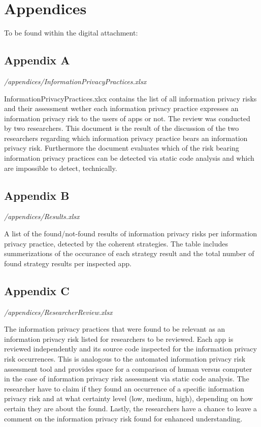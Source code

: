 \section*{Appendices}

To be found within the digital attachment:

\subsection*{Appendix A}

\textit{/appendices/InformationPrivacyPractices.xlsx}

InformationPrivacyPractices.xlsx contains the list of all information privacy risks and their assessment wether each information privacy practice expresses an information privacy risk to the users of \mH apps or not.
The review was conducted by two researchers. 
This document is the result of the discussion of the two researchers regarding which information privacy practice bears an information privacy risk.
Furthermore the document evaluates which of the risk bearing information privacy practices can be detected via static code analysis and which are impossible to detect, technically.

\subsection*{Appendix B}

\textit{/appendices/Results.xlsx}

A list of the found/not-found results of information privacy risks per information privacy practice, detected by the coherent \AIPRAT strategies.
The table includes summerizations of the occurance of each strategy result and the total number of found strategy results per inspected app.

\subsection*{Appendix C}

\textit{/appendices/ResearcherReview.xlsx}

The information privacy practices that were found to be relevant as an information privacy risk listed for researchers to be reviewed.
Each app is reviewed independently and its source code inspected for the information privacy risk occurrences.
This is analogous to the automated information privacy risk assessment tool and provides space for a comparison of human versus computer in the case of information privacy risk assessment via static code analysis.
The researcher have to claim if they found an occurrence of a specific information privacy risk and at what certainty level (low, medium, high), depending on how certain they are about the found.
Lastly, the researchers have a chance to leave a comment on the information privacy risk found for enhanced understanding.